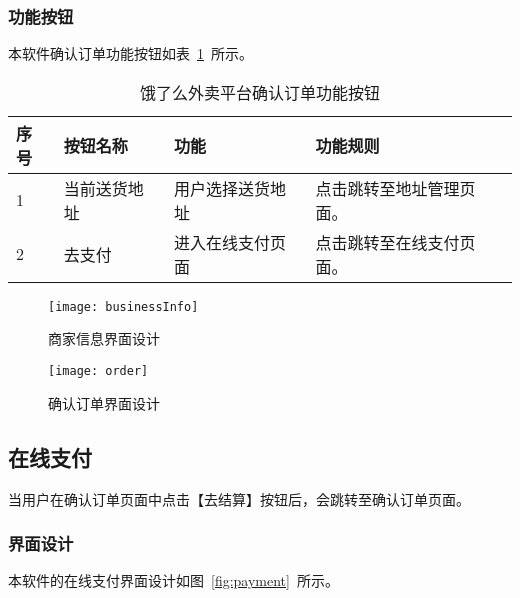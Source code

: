 \subsubsection{功能按钮}
本软件确认订单功能按钮如表~\ref{tab:table5}~所示。
\begin{table}[htbp]
    \caption{饿了么外卖平台确认订单功能按钮}\label{tab:table5}
    \vspace{0.5em}\wuhao
    \begin{tabularx}{\textwidth}{lllX}
    \toprule[1.5pt]
    序号 & 按钮名称 & 功能 & 功能规则 \\ 
    \midrule[1pt]
    1 & 当前送货地址 & 用户选择送货地址 & 点击跳转至地址管理页面。 \\
    2 & 去支付 & 进入在线支付页面 & 点击跳转至在线支付页面。 \\
\bottomrule[1.5pt]
\end{tabularx}
\vspace{\baselineskip}
\end{table}
\begin{figure}[htbp]
    \centering
    \begin{minipage}{0.4\textwidth}
    \centering
    \texttt{[image: businessInfo]}
    \caption{商家信息界面设计}\label{fig:businessInfo}
    \end{minipage}
    \begin{minipage}{0.4\textwidth}
    \centering
    \texttt{[image: order]}
    \caption{确认订单界面设计}\label{fig:order}
    \end{minipage}
    \vspace{\baselineskip}
\end{figure}

\subsection{在线支付}
当用户在确认订单页面中点击【去结算】按钮后，会跳转至确认订单页面。
\subsubsection{界面设计}
本软件的在线支付界面设计如图~\ref{fig:payment}~所示。
